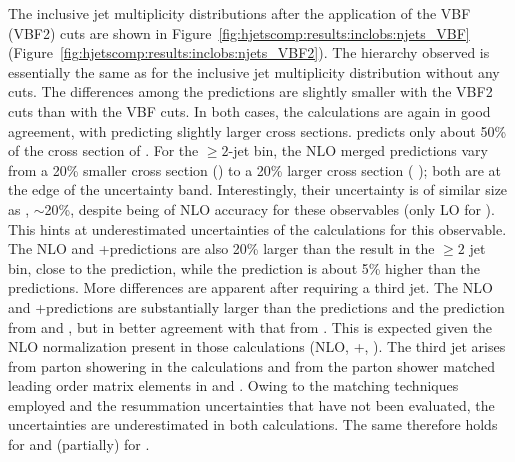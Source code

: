 The inclusive jet multiplicity distributions after the application of
the VBF (VBF2) cuts are shown in
Figure~\ref{fig:hjetscomp:results:inclobs:njets_VBF}
(Figure~\ref{fig:hjetscomp:results:inclobs:njets_VBF2}).  The
hierarchy observed is essentially the same as for the inclusive jet
multiplicity distribution without any cuts. The differences among the
predictions are slightly smaller with the VBF2 cuts than with the VBF
cuts.  In both cases, the \NNLOPS calculations are again in good 
agreement, with \Sherpa \NNLOPS predicting slightly larger cross sections.
\Hej predicts only about 50\% of the cross section of \NNLOPS.
For the $\ge2$-jet bin, the NLO merged predictions vary from a 20\%
smaller cross section (\MGaMC) to a 20\% larger cross section (\Sherpa
\MEPSatNLO); both are at the edge of the \NNLOPS uncertainty
band. Interestingly, their uncertainty is of similar size as \NNLOPS,
$\sim$20\%, despite being of NLO accuracy for these observables (only
LO for \NNLOPS). This hints at underestimated uncertainties of the
\NNLOPS calculations for this observable. The NLO and \Minlo
\GoSam{}+\Sherpa predictions are also 20\% larger than the \NNLOPS
result in the $\ge2$ jet bin, close to the \Sherpa \MEPSatNLO
prediction, while the \Loopsim prediction is about 5\% higher than the
\NNLOPS predictions.
More differences are apparent after requiring a third jet. The NLO and
\Minlo \GoSam{}+\Sherpa predictions are substantially larger than the
\NNLOPS predictions and the prediction from \MGaMC and \Herwig, but in better
agreement with that from \Sherpa \MEPSatNLO. This is expected given
the NLO normalization present in those calculations (NLO,\Minlo
\GoSam{}+\Sherpa, \Sherpa \MEPSatNLO). The third jet arises from parton
showering in the \NNLOPS calculations and from the parton shower matched 
leading order matrix elements in \MGaMC and \Herwig. Owing to the  
matching techniques employed and the  resummation uncertainties that have not been evaluated, 
the uncertainties are underestimated in both calculations. The same 
therefore holds for \Powheg \NNLOPS and (partially) for \Sherpa 
\NNLOPS. 

